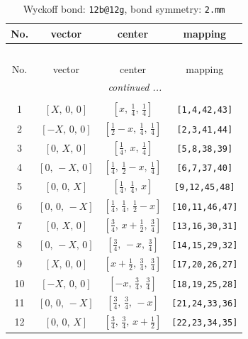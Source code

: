 \documentclass[fleqn,8pt]{jsarticle}
\begin{document}
\renewcommand{\arraystretch}{1.2}
\begin{longtable}{cccc}
\caption{Wyckoff bond: {\tt 12b@12g}, bond symmetry: {\tt 2.mm}}
 \\
 \hline \hline
No. & vector & center & mapping \\ \hline \endfirsthead

\multicolumn{3}{l}{\tablename\ \thetable{}} \\
 \hline \hline
No. & vector & center & mapping \\ \hline \endhead

 \hline \hline
\multicolumn{3}{r}{\footnotesize\it continued ...} \\ \endfoot

 \hline \hline
\multicolumn{3}{r}{} \\ \endlastfoot

1 & $\left[ X,\, 0,\, 0 \right]$ & $\left[ x,\, \frac{1}{4},\, \frac{1}{4} \right]$ & {\tt [1,4,42,43]} \\ \hline
2 & $\left[ - X,\, 0,\, 0 \right]$ & $\left[ \frac{1}{2} - x,\, \frac{1}{4},\, \frac{1}{4} \right]$ & {\tt [2,3,41,44]} \\ \hline
3 & $\left[ 0,\, X,\, 0 \right]$ & $\left[ \frac{1}{4},\, x,\, \frac{1}{4} \right]$ & {\tt [5,8,38,39]} \\ \hline
4 & $\left[ 0,\, - X,\, 0 \right]$ & $\left[ \frac{1}{4},\, \frac{1}{2} - x,\, \frac{1}{4} \right]$ & {\tt [6,7,37,40]} \\ \hline
5 & $\left[ 0,\, 0,\, X \right]$ & $\left[ \frac{1}{4},\, \frac{1}{4},\, x \right]$ & {\tt [9,12,45,48]} \\ \hline
6 & $\left[ 0,\, 0,\, - X \right]$ & $\left[ \frac{1}{4},\, \frac{1}{4},\, \frac{1}{2} - x \right]$ & {\tt [10,11,46,47]} \\ \hline
7 & $\left[ 0,\, X,\, 0 \right]$ & $\left[ \frac{3}{4},\, x + \frac{1}{2},\, \frac{3}{4} \right]$ & {\tt [13,16,30,31]} \\ \hline
8 & $\left[ 0,\, - X,\, 0 \right]$ & $\left[ \frac{3}{4},\, - x,\, \frac{3}{4} \right]$ & {\tt [14,15,29,32]} \\ \hline
9 & $\left[ X,\, 0,\, 0 \right]$ & $\left[ x + \frac{1}{2},\, \frac{3}{4},\, \frac{3}{4} \right]$ & {\tt [17,20,26,27]} \\ \hline
10 & $\left[ - X,\, 0,\, 0 \right]$ & $\left[ - x,\, \frac{3}{4},\, \frac{3}{4} \right]$ & {\tt [18,19,25,28]} \\ \hline
11 & $\left[ 0,\, 0,\, - X \right]$ & $\left[ \frac{3}{4},\, \frac{3}{4},\, - x \right]$ & {\tt [21,24,33,36]} \\ \hline
12 & $\left[ 0,\, 0,\, X \right]$ & $\left[ \frac{3}{4},\, \frac{3}{4},\, x + \frac{1}{2} \right]$ & {\tt [22,23,34,35]} \\
\end{longtable}
\end{document}
